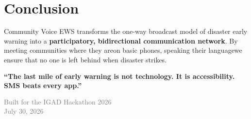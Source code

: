 \documentclass[11pt,a4paper]{article}
\begin{document}
\section{Conclusion}

Community Voice EWS transforms the one-way broadcast model of disaster early warning into a \textbf{participatory, bidirectional communication network}. By meeting communities where they are\textemdash on basic phones, speaking their language\textemdash we ensure that no one is left behind when disaster strikes.

\vspace{0.3cm}
\begin{infobox}
\centering
\textbf{``The last mile of early warning is not technology. It is accessibility. SMS beats every app.''}
\end{infobox}

\vspace{0.8cm}
\begin{center}
  \textcolor{grey}{\large Built for the IGAD Hackathon 2026} \\[0.1cm]
  \textcolor{grey}{\small July 30, 2026}
\end{center}
\end{document}
